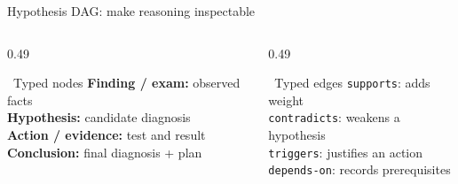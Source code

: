 \documentclass[aspectratio=169,t]{beamer}
\begin{document}
\begin{frame}{Hypothesis DAG: make reasoning inspectable}
  \vspace{-0.8mm}
  \begin{columns}[T,onlytextwidth]
    \begin{column}{0.49\textwidth}
      \begin{block}{\faSitemap\;\, Typed nodes}
        \scriptsize
        \textbf{Finding / exam:} observed facts\\[-0.2mm]
        \textbf{Hypothesis:} candidate diagnosis\\[-0.2mm]
        \textbf{Action / evidence:} test and result\\[-0.2mm]
        \textbf{Conclusion:} final diagnosis + plan
      \end{block}
    \end{column}%
    \hfill
    \begin{column}{0.49\textwidth}
      \begin{exampleblock}{\faProjectDiagram\;\, Typed edges}
        \scriptsize
        \texttt{supports}: adds weight\\[-0.2mm]
        \texttt{contradicts}: weakens a hypothesis\\[-0.2mm]
        \texttt{triggers}: justifies an action\\[-0.2mm]
        \texttt{depends-on}: records prerequisites
      \end{exampleblock}
    \end{column}
  \end{columns}
\end{frame}
\end{document}
